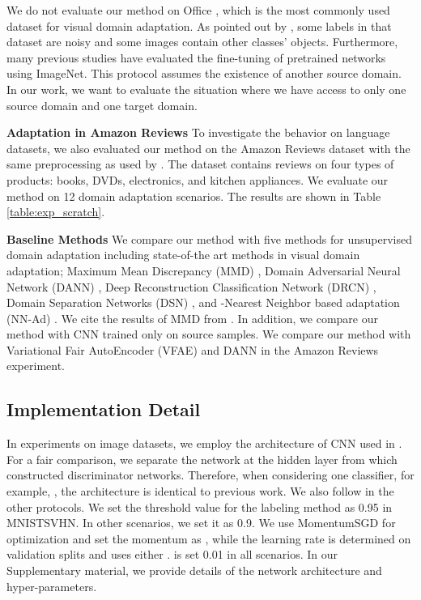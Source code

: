 \documentclass{article}
\begin{document}
We do not evaluate our method on Office \cite{saenko2010adapting}, which is the most commonly used dataset for visual domain adaptation. As pointed out by \cite{bousmalis2016domain}, some labels in that dataset are noisy and some images contain other classes' objects.
Furthermore, many previous studies have evaluated the fine-tuning of pretrained networks using ImageNet. This protocol assumes the existence of another source domain. In our work, we want to evaluate the situation where we have access to only one source domain and one target domain.

\textbf{Adaptation in Amazon Reviews}
To investigate the behavior on language datasets, we also evaluated our method on the Amazon Reviews dataset \cite{blitzer2006domain} with the same preprocessing as used by \cite{coda,ganin2016domain}. The dataset contains reviews on four types of products: books, DVDs, electronics, and kitchen appliances.
We evaluate our method on 12 domain adaptation scenarios.
The results are shown in Table \ref{table:exp_scratch}.

\textbf{Baseline Methods}
We compare our method with five methods for unsupervised domain adaptation including state-of-the art methods in visual domain adaptation; Maximum Mean Discrepancy (MMD) \cite{long2015learning}, Domain Adversarial Neural Network (DANN) \cite{ganin2014unsupervised}, Deep Reconstruction Classification Network (DRCN) \cite{ghifary2016deep}, Domain Separation Networks (DSN) \cite{bousmalis2016domain}, and -Nearest Neighbor based adaptation (NN-Ad) \cite{sener2016learning}. We cite the results of MMD from \cite{bousmalis2016domain}. In addition, we compare our method with CNN trained only on source samples. We compare our method with Variational Fair AutoEncoder (VFAE) \cite{louizos2015variational} and DANN \cite{ganin2016domain} in the Amazon Reviews experiment. 

\subsection{Implementation Detail}
In experiments on image datasets, we employ the architecture of CNN used in \cite{ganin2014unsupervised}. For a fair comparison, we separate the network at the hidden layer from which \cite{ganin2014unsupervised} constructed discriminator networks. Therefore, when considering one classifier, for example, , the architecture is identical to previous work. We also follow \cite{ganin2014unsupervised} in the other protocols. We set the threshold value for the labeling method as 0.95 in MNISTSVHN. In other scenarios, we set it as 0.9. We use MomentumSGD for optimization and set the momentum as , while the learning rate is determined on validation splits and uses either .
 is set 0.01 in all scenarios. In our Supplementary material, we provide details of the network architecture and hyper-parameters.
\end{document}
